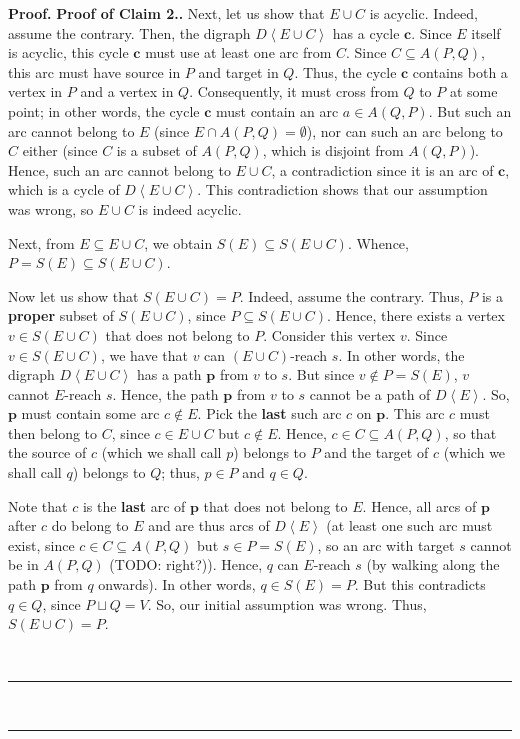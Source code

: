 \documentclass[numbers=enddot,12pt,final,onecolumn,notitlepage]{scrartcl}%
\theoremstyle{definition}
\newenvironment{proof}[1][Proof]{\noindent\textbf{#1.} }{\ \rule{0.5em}{0.5em}}
\theoremstyle{plainsl}
\begin{document}
\begin{proof}
\begin{proof}[Proof of Claim 2.]
    Next, let us show that $E \cup C$ is acyclic. Indeed, assume the contrary. Then, the digraph $D \left\langle E \cup C \right\rangle$ has a cycle $\textbf{c}$. Since $E$ itself is acyclic, this cycle $\textbf{c}$ must use at least one arc from $C$. Since $C \subseteq A(P,Q)$, this arc must have source in $P$ and target in $Q$. Thus, the cycle $\textbf{c}$ contains both a vertex in $P$ and a vertex in $Q$. Consequently, it must cross from $Q$ to $P$ at some point; in other words, the cycle $\textbf{c}$ must contain an arc $a \in A(Q,P)$. But such an arc cannot belong to $E$ (since $E \cap A(P,Q) = \emptyset$), nor can such an arc belong to $C$ either (since $C$ is a subset of $A(P,Q)$, which is disjoint from $A(Q,P)$). Hence, such an arc cannot belong to $E \cup C$, a contradiction since it is an arc of $\textbf{c}$, which is a cycle of $D \left\langle E \cup C \right\rangle$. This contradiction shows that our assumption was wrong, so $E \cup C$ is indeed acyclic.

    Next, from $E \subseteq E \cup C$, we obtain $S(E) \subseteq S(E\cup C)$. Whence, $P = S(E) \subseteq S(E \cup C)$.

    Now let us show that $S(E \cup C) = P$. Indeed, assume the contrary. Thus, $P$ is a \textbf{proper} subset of $S(E \cup C)$, since $P \subseteq S(E\cup C)$. Hence, there exists a vertex $v \in S(E \cup C)$ that does not belong to $P$. Consider this vertex $v$. Since $v \in S(E \cup C)$, we have that $v$ can $(E \cup C)$-reach $s$. In other words, the digraph $D \left\langle E \cup C \right\rangle $ has a path $\textbf{p}$ from $v$ to $s$. But since $v \notin P = S(E)$, $v$ cannot $E$-reach $s$. Hence, the path $\textbf{p}$ from $v$ to $s$ cannot be a path of $D \left\langle E \right\rangle$. So, $\textbf{p}$ must contain some arc $c \notin E$. Pick the \textbf{last} such arc $c$ on $\textbf{p}$. This arc $c$ must then belong to $C$, since $c \in E \cup C$ but $c \notin E$. Hence, $c \in C \subseteq A(P,Q)$, so that the source of $c$ (which we shall call $p$) belongs to $P$ and the target of $c$ (which we shall call $q$) belongs to $Q$; thus, $p \in P$ and $q \in Q$.

    Note that $c$ is the \textbf{last} arc of $\textbf{p}$ that does not belong to $E$. Hence, all arcs of $\textbf{p}$ after $c$ do belong to $E$ and are thus arcs of $D \left\langle E \right\rangle$ (at least one such arc must exist, since $c \in C\subseteq A(P,Q)$ but $s \in P = S(E)$, so an arc with target $s$ cannot be in $A(P,Q)$ (TODO: right?)). Hence, $q$ can $E$-reach $s$ (by walking along the path $\textbf{p}$ from $q$ onwards). In other words, $q \in S(E) = P$. But this contradicts $q \in Q$, since $P \sqcup Q = V$. So, our initial assumption was wrong. Thus, $S(E \cup C) = P$.


\end{proof}
\end{proof}
\end{document}
